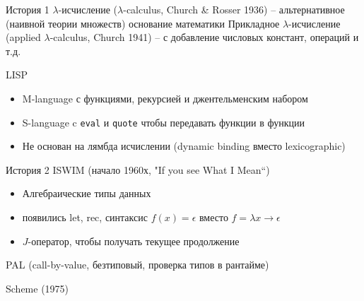 \documentclass{beamer}
\def\faQuestionSign{{\FA\symbol{"F059}}}
\newcommand{\faGood}{\textcolor{ForestGreen}{\faThumbsUp}}
\newcommand{\faBad}{\textcolor{red}{\faThumbsODown}}
\begin{document}
% 
% 
% 
% 

\begin{frame}{История 1}
$\lambda$-исчисление ($\lambda$-calculus, Church \& Rosser 1936) -- альтернативное (наивной теории множеств) основание математики
\newline \newline
Прикладное $\lambda$-исчисление (applied $\lambda$-calculus, Church 1941) -- с добавление числовых констант, операций и т.д.

\pause
LISP
\begin{itemize}
\item[\faGood] M-language с функциями, рекурсией и джентельменским набором
\item[\faGood] S-language c \lstinline{eval} и \lstinline{quote} чтобы передавать функции в функции
\item[\faBad] Не основан на лямбда исчислении (dynamic binding вместо lexicographic)
\end{itemize}

\end{frame}

\begin{frame}{История 2 }
ISWIM (начало 1960х, "If you see What I Mean``)
\begin{itemize}
\item Алгебраические типы данных
\item появились let, rec, синтаксис $f(x) = \epsilon$ 
            вместо $f = \lambda x \rightarrow \epsilon$
\item $J$-оператор, чтобы получать текущее продолжение
\end{itemize}
PAL (call-by-value, безтиповый, проверка типов в рантайме)

Scheme (1975)
\end{frame}
\end{document}
